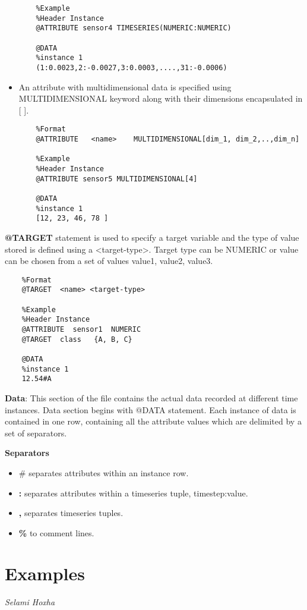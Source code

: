 \begin{itemize}
\begin{verbatim}
    %Example
    %Header Instance
    @ATTRIBUTE sensor4 TIMESERIES(NUMERIC:NUMERIC)
    
    @DATA
    %instance 1
    (1:0.0023,2:-0.0027,3:0.0003,....,31:-0.0006)
\end{verbatim}
\endgroup
\item An attribute with multidimensional data is specified using MULTIDIMENSIONAL keyword along with their dimensions encapsulated in [ ].
\begingroup
\fontsize{10pt}{12pt}\selectfont
\begin{verbatim}
    %Format
    @ATTRIBUTE   <name>    MULTIDIMENSIONAL[dim_1, dim_2,..,dim_n]
    
    %Example
    %Header Instance
    @ATTRIBUTE sensor5 MULTIDIMENSIONAL[4]

    @DATA
    %instance 1
    [12, 23, 46, 78 ]
\end{verbatim}
\endgroup
\end{itemize}
\textbf{@TARGET} statement is used to specify a target variable and the type of value stored is defined using a <target-type>. Target type can be NUMERIC or value can be chosen from a set of values {value1, value2, value3}.
\begin{verbatim}
    %Format 
    @TARGET  <name>	<target-type>
    
    %Example
    %Header Instance
    @ATTRIBUTE  sensor1  NUMERIC
    @TARGET  class   {A, B, C}

    @DATA
    %instance 1
    12.54#A
 \end{verbatim}
\textbf{Data}: This section of the file contains the actual data recorded at different time instances. Data section begins with @DATA statement. Each instance of data is contained in one row, containing all the attribute values which are delimited by a set of separators.

\textbf{Separators}
\begin{itemize}
    \item $\#$ separates attributes within an instance row.
    \item \textbf{:} separates attributes within a timeseries tuple, {timestep:value}.
    \item \textbf{,} separates timeseries tuples.
    \item \textbf{\%} to comment lines.
\end{itemize}

\section{Examples}
\vspace*{-15mm}\hfill{\normalsize\emph{Selami Hoxha}}
\label{sec:data_format:examples}

